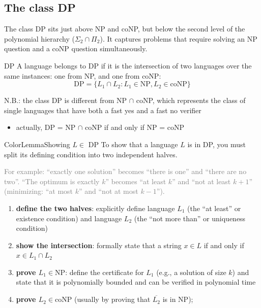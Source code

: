 \documentclass[a4paper, 11pt]{report}
\begin{document}
\subsection{The class DP}
The class DP sits just above NP and coNP, but below the second level of the polynomial hierarchy ($\Sigma_2 \cap \Pi_2$). It captures problems that require solving an NP question and a coNP question simultaneously.

\begin{defframe}{DP}{}
    A language belongs to DP if it is the intersection of two languages over the same instances: one from NP, and one from coNP:
 $$\text{DP} = \{L_1 \cap L_2 : L_1 \in \text{NP}, L_2 \in \text{coNP}\}$$
\end{defframe}

N.B.: the class DP is different from NP $\cap $ coNP, which represents the class of single languages that have both a fast yes and a fast no verifier
\begin{itemize}
    \item actually, DP = NP $\cap$ coNP if and only if NP = coNP
\end{itemize}

\begin{cframe}{ColorLemma}{Showing $L \in$ DP}
    To show that a language $L$ is in DP, you must split its defining condition into two independent halves. 

    \textcolor{gray}{For example: ``exactly one solution'' becomes ``there is one'' and ``there are no two''. ``The optimum is exactly $k$'' becomes ``at least $k$'' and ``not at least $k + 1$'' (minimizing: ``at most $k$'' and ``not at most $k - 1$'').}
    \begin{enumerate}
        \item \textbf{define the two halves}: explicitly define language $L_1$ (the ``at least'' or existence condition) and language $L_2$ (the ``not more than'' or uniqueness condition)
        \item \textbf{show the intersection}: formally state that a string $x \in L$ if and only if $x \in L_1 \cap L_2$
        \item \textbf{prove $L_1 \in \text{NP}$}: define the certificate for $L_1$ (e.g., a solution of size $k$) and state that it is polynomially bounded and can be verified in polynomial time
        \item \textbf{prove $L_2 \in \text{coNP}$} (usually by proving that $\overline{L_2}$ is in NP);
    \end{enumerate}
\end{cframe}
\end{document}

